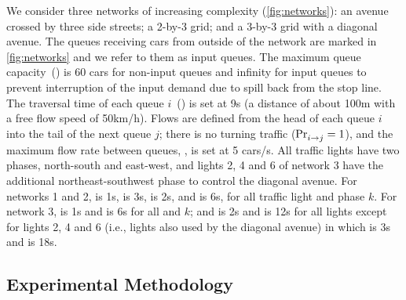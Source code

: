We consider three networks of increasing complexity (\cref{fig:networks}): an
avenue crossed by three side streets; a 2-by-3 grid; and a 3-by-3 grid with a
diagonal avenue.
%
The queues receiving cars from outside of the network are marked in
\cref{fig:networks} and we refer to them as input queues.
%
The maximum queue capacity~() is 60 cars for non-input queues and
infinity for input queues to prevent interruption of the input demand due to
spill back from the stop line. 
%
The traversal time of each queue $i$~() is set at 9s (a distance of
about 100m with a free flow speed of 50km/h).
%
Flows are defined from the head of each queue $i$ into the tail of the next
queue $j$;
%
there is no turning traffic ($\mathrm{Pr}_{i\to j}^{\mathrm{}}=1$), and the maximum flow rate
between queues, , is set at 5 cars/s.
%
All traffic lights have two phases, north-south and east-west, and lights 2, 4
and 6 of network 3 have the additional northeast-southwest phase to control the
diagonal avenue.
%
For networks 1 and 2,  is 1s,  is 3s, \CTMIN{\tl} is
2s, and \CTMAX{\tl} is 6s, for all traffic light \tl and phase $k$.
%
For network 3,  is 1s and  is 6s for all \tl and
$k$; and \CTMIN{\tl} is 2s and \CTMAX{\tl} is 12s for all lights \tl except for
lights 2, 4 and 6 (i.e., lights also used by the diagonal avenue) in which
\CTMIN{\tl} is 3s and \CTMAX{\tl} is 18s.




\subsection{Experimental Methodology}



